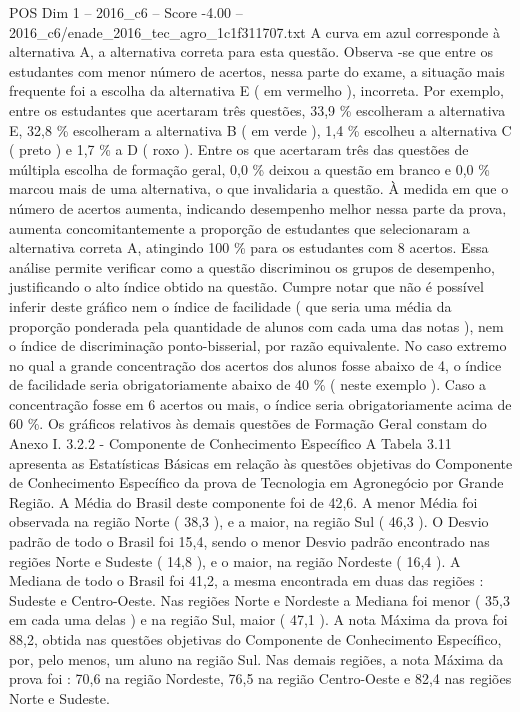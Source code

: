 \begin{textsample}{POS Dim 1 – 2016\_c6 – Score -4.00 – 2016\_c6/enade\_2016\_tec\_agro\_1c1f311707.txt}
A curva em azul corresponde à alternativa A, a alternativa correta para esta questão.
Observa -se que entre os estudantes com menor número de acertos, nessa parte do exame, a situação mais frequente foi a escolha da alternativa E ( em vermelho ), incorreta.
Por exemplo, entre os estudantes que acertaram três questões, 33,9 \% escolheram a alternativa E, 32,8 \% escolheram a alternativa B ( em verde ), 1,4 \% escolheu a alternativa C ( preto ) e 1,7 \% a D ( roxo ).
Entre os que acertaram três das questões de múltipla escolha de formação geral, 0,0 \% deixou a questão em branco e 0,0 \% marcou mais de uma alternativa, o que invalidaria a questão.
À medida em que o número de acertos aumenta, indicando desempenho melhor nessa parte da prova, aumenta concomitantemente a proporção de estudantes que selecionaram a alternativa correta A, atingindo 100 \% para os estudantes com 8 acertos.
Essa análise permite verificar como a questão discriminou os grupos de desempenho, justificando o alto índice obtido na questão.
Cumpre notar que não é possível inferir deste gráfico nem o índice de facilidade ( que seria uma média da proporção ponderada pela quantidade de alunos com cada uma das notas ), nem o índice de discriminação ponto-bisserial, por razão equivalente.
No caso extremo no qual a grande concentração dos acertos dos alunos fosse abaixo de 4, o índice de facilidade seria obrigatoriamente abaixo de 40 \% ( neste exemplo ).
Caso a concentração fosse em 6 acertos ou mais, o índice seria obrigatoriamente acima de 60 \%.
Os gráficos relativos às demais questões de Formação Geral constam do Anexo I. 3.2.2 - Componente de Conhecimento Específico A Tabela 3.11 apresenta as Estatísticas Básicas em relação às questões objetivas do Componente de Conhecimento Específico da prova de Tecnologia em Agronegócio por Grande Região.
A Média do Brasil deste componente foi de 42,6.
A menor Média foi observada na região Norte ( 38,3 ), e a maior, na região Sul ( 46,3 ).
O Desvio padrão de todo o Brasil foi 15,4, sendo o menor Desvio padrão encontrado nas regiões Norte e Sudeste ( 14,8 ), e o maior, na região Nordeste ( 16,4 ).
A Mediana de todo o Brasil foi 41,2, a mesma encontrada em duas das regiões : Sudeste e Centro-Oeste.
Nas regiões Norte e Nordeste a Mediana foi menor ( 35,3 em cada uma delas ) e na região Sul, maior ( 47,1 ).
A nota Máxima da prova foi 88,2, obtida nas questões objetivas do Componente de Conhecimento Específico, por, pelo menos, um aluno na região Sul.
Nas demais regiões, a nota Máxima da prova foi : 70,6 na região Nordeste, 76,5 na região Centro-Oeste e 82,4 nas regiões Norte e Sudeste.

\end{textsample}
